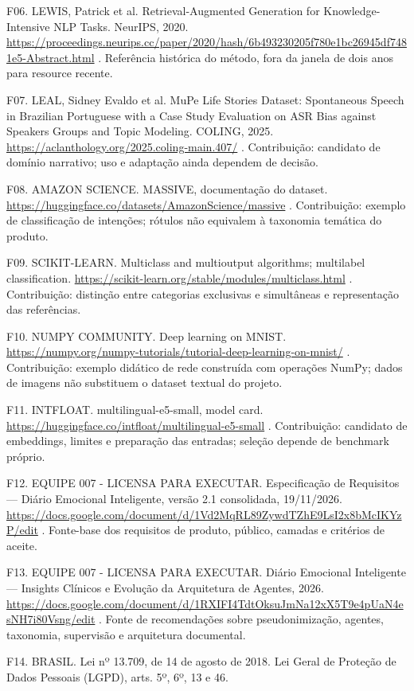 \documentclass[11pt,a4paper]{article}
\begin{document}
F06. LEWIS, Patrick et al. Retrieval-Augmented Generation for Knowledge-Intensive NLP Tasks. NeurIPS, 2020. \url{https://proceedings.neurips.cc/paper/2020/hash/6b493230205f780e1bc26945df7481e5-Abstract.html} . Referência histórica do método, fora da janela de dois anos para resource recente.

F07. LEAL, Sidney Evaldo et al. MuPe Life Stories Dataset: Spontaneous Speech in Brazilian Portuguese with a Case Study Evaluation on ASR Bias against Speakers Groups and Topic Modeling. COLING, 2025. \url{https://aclanthology.org/2025.coling-main.407/} . Contribuição: candidato de domínio narrativo; uso e adaptação ainda dependem de decisão.

F08. AMAZON SCIENCE. MASSIVE, documentação do dataset. \url{https://huggingface.co/datasets/AmazonScience/massive} . Contribuição: exemplo de classificação de intenções; rótulos não equivalem à taxonomia temática do produto.

F09. SCIKIT-LEARN. Multiclass and multioutput algorithms; multilabel classification. \url{https://scikit-learn.org/stable/modules/multiclass.html} . Contribuição: distinção entre categorias exclusivas e simultâneas e representação das referências.

F10. NUMPY COMMUNITY. Deep learning on MNIST. \url{https://numpy.org/numpy-tutorials/tutorial-deep-learning-on-mnist/} . Contribuição: exemplo didático de rede construída com operações NumPy; dados de imagens não substituem o dataset textual do projeto.

F11. INTFLOAT. multilingual-e5-small, model card. \url{https://huggingface.co/intfloat/multilingual-e5-small} . Contribuição: candidato de embeddings, limites e preparação das entradas; seleção depende de benchmark próprio.

F12. EQUIPE 007 - LICENSA PARA EXECUTAR. Especificação de Requisitos — Diário Emocional Inteligente, versão 2.1 consolidada, 19/11/2026. \url{https://docs.google.com/document/d/1Vd2MqRL89ZywdTZhE9LsI2x8bMcIKYzP/edit} . Fonte-base dos requisitos de produto, público, camadas e critérios de aceite.

F13. EQUIPE 007 - LICENSA PARA EXECUTAR. Diário Emocional Inteligente — Insights Clínicos e Evolução da Arquitetura de Agentes, 2026. \url{https://docs.google.com/document/d/1RXIFI4TdtOksuJmNa12xX5T9e4pUaN4esNH7i80Vsng/edit} . Fonte de recomendações sobre pseudonimização, agentes, taxonomia, supervisão e arquitetura documental.

F14. BRASIL. Lei nº 13.709, de 14 de agosto de 2018. Lei Geral de Proteção de Dados Pessoais (LGPD), arts. 5º, 6º, 13 e 46.
\end{document}
